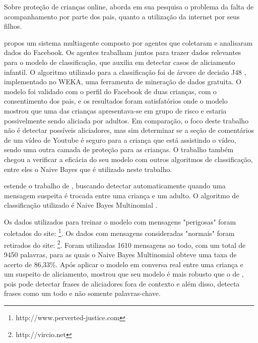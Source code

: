 Sobre proteção de crianças online,  aborda em sua pesquisa o problema da falta de acompanhamento por parte dos pais, quanto a utilização da internet por seus filhos. 

\cite{marioFalcao2016} propos um sistema multiagente composto por agentes que coletaram e analisaram dados do Facebook. Os agentes trabalham juntos para trazer dados relevantes para o modelo de classificação, que auxilia em detectar casos de aliciamento infantil. O algoritmo utilizado para a classificação foi de árvore de decisão J48 \cite{quinlan1986induction}, implementado no WEKA, uma ferramenta de mineração de dados gratuita. O modelo foi validado com o perfil do Facebook de duas crianças, com o consentimento dos pais, e os resultados foram satisfatórios onde o modelo mostrou que uma das crianças apresentava-se em grupo de risco e estaria possivelmente sendo aliciada por adultos. 
Em comparação, o foco deste trabalho não é detectar possíveis aliciadores, mas sim determinar se a seção de comentários de um vídeo de Youtube é seguro para a criança que está assistindo o vídeo, sendo uma outra camada de proteção para as crianças. O trabalho \cite{marioFalcao2016} também chegou a verificar a eficácia do seu modelo com outros algoritmos de classificação, entre eles o Naive Bayes que é utilizado neste trabalho.

\cite{EnyoGoncalves2017} estende o trabalho de \cite{marioFalcao2016}, buscando detectar automaticamente quando uma mensagem suspeita é trocada entre uma criança e um adulto. O algoritmo de classificação utilizado é Naive Bayes Multinomial \cite{metsis2006spamBayes}.

Os dados utilizados para treinar o modelo com mensagens "perigosas" foram coletados do site: \footnote{http://www.perverted-justice.com}. Os dados com mensagens consideradas "normais" foram retirados do site: \footnote{http://vircio.net}. Foram utilizadas 1610 mensagens ao todo, com um total de 9450 palavras, para as quais o Naive Bayes Multinomial obteve uma taxa de acerto de 86,33\%. Após aplicar o modelo em conversa real entre uma criança e um suspeito de aliciamento, \cite{EnyoGoncalves2017} mostrou que seu modelo é mais robusto que o de \cite{marioFalcao2016}, pois pode detectar frases de aliciadores fora de contexto e além disso, detecta frases como um todo e não somente palavras-chave.

